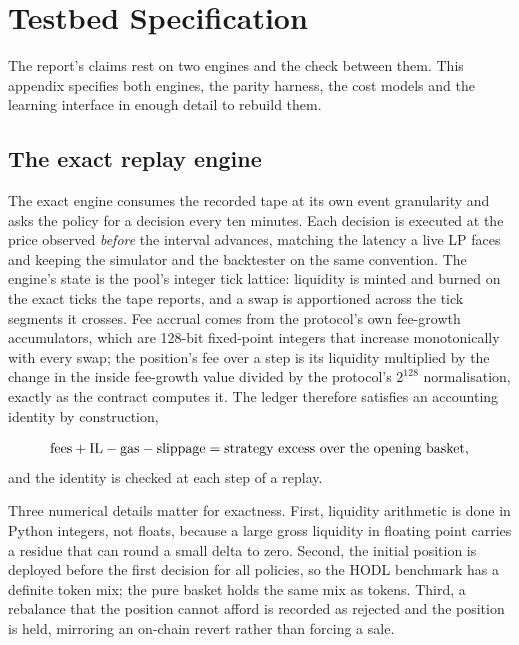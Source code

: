 \section{Testbed Specification}
\label{app:system}

The report's claims rest on two engines and the check between them. This
appendix specifies both engines, the parity harness, the cost models and the
learning interface in enough detail to rebuild them.

\subsection{The exact replay engine}

The exact engine consumes the recorded tape at its own event granularity and
asks the policy for a decision every ten minutes. Each decision is executed at
the price observed \emph{before} the interval advances, matching the latency a
live LP faces and keeping the simulator and the backtester on the same
convention. The engine's state is the pool's integer tick lattice: liquidity
is minted and burned on the exact ticks the tape reports, and a swap is
apportioned across the tick segments it crosses. Fee accrual comes from the
protocol's own fee-growth accumulators, which are 128-bit fixed-point integers
that increase monotonically with every swap; the position's fee over a step is
its liquidity multiplied by the change in the inside fee-growth value divided
by the protocol's $2^{128}$ normalisation, exactly
as the contract computes it. The ledger therefore satisfies an accounting
identity by construction,

\begin{equation}
\text{fees} + \mathrm{IL} - \text{gas} - \text{slippage}
= \text{strat\-egy excess over the opening basket},
\label{eq:app-identity}
\end{equation}
and the identity is checked at each step of a replay.

Three numerical details matter for exactness. First, liquidity arithmetic is
done in Python integers, not floats, because a large gross liquidity in
floating point carries a residue that can round a small delta to zero.
Second, the initial position is deployed before the first decision for all
policies, so the HODL benchmark has a definite token mix; the pure basket holds
the same mix as tokens. Third, a rebalance that the position cannot afford is
recorded as rejected and the position is held, mirroring an on-chain revert
rather than forcing a sale.

